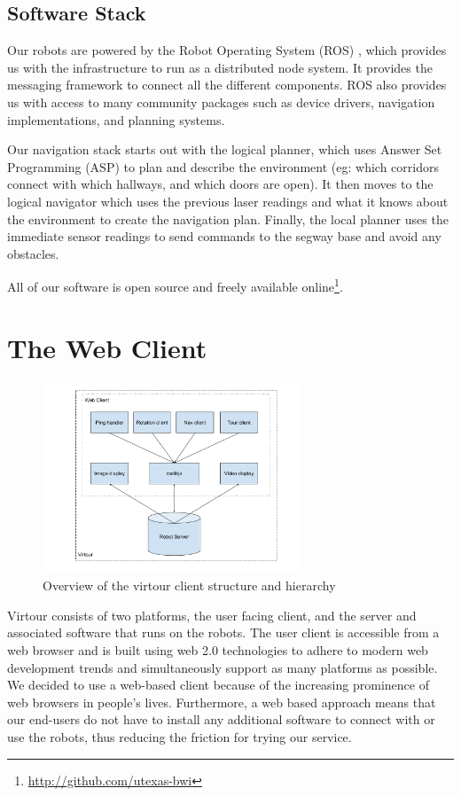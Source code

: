 \documentclass[
  oneside,
  11pt, a4paper,
  footinclude=true,
  headinclude=true,
  cleardoublepage=empty
]{article}
\begin{document}
\subsection{Software Stack}

Our robots are powered by the Robot Operating System (ROS) \cite{quigley2009},
which provides us with the infrastructure to run as a distributed node system.
It provides the messaging framework to connect all the different components.
ROS also provides us with access to many community packages such as device
drivers, navigation implementations, and planning systems.

Our navigation stack starts out with the logical planner, which uses Answer Set
Programming (ASP) \cite{lifschitz2008} to plan and describe the environment
(eg: which corridors connect with which hallways, and which doors are open). It
then moves to the logical navigator which uses the previous laser readings and
what it knows about the environment to create the navigation plan. Finally, the
local planner uses the immediate sensor readings to send commands to the segway
base and avoid any obstacles.

All of our software is open source and freely available
online\footnote{\url{http://github.com/utexas-bwi}}.

\section{The Web Client}

\begin{figure}
\centering
\includegraphics[width=3in]{virtour_client}
\caption{Overview of the virtour client structure and hierarchy}
\end{figure}

Virtour consists of two platforms, the user facing client, and the server and
associated software that runs on the robots. The user client is accessible from
a web browser and is built using web 2.0 technologies to adhere to modern web
development trends and simultaneously support as many platforms as possible. We
decided to use a web-based client because of the increasing prominence of web
browsers in people's lives. Furthermore, a web based approach means that our
end-users do not have to install any additional software to connect with or use
the robots, thus reducing the friction for trying our service.
\end{document}
